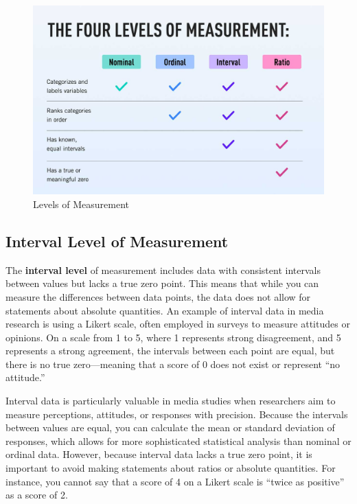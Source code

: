 \documentclass[
]{book}
\begin{document}
\begin{figure}
\centering
\includegraphics[width=1\linewidth,height=\textheight,keepaspectratio]{images/levels.jpg}
\caption{Levels of Measurement}
\end{figure}

\subsection*{Interval Level of Measurement}\label{interval-level-of-measurement}

The \textbf{interval level} of measurement includes data with consistent intervals between values but lacks a true zero point. This means that while you can measure the differences between data points, the data does not allow for statements about absolute quantities. An example of interval data in media research is using a Likert scale, often employed in surveys to measure attitudes or opinions. On a scale from 1 to 5, where 1 represents strong disagreement, and 5 represents a strong agreement, the intervals between each point are equal, but there is no true zero---meaning that a score of 0 does not exist or represent ``no attitude.''

Interval data is particularly valuable in media studies when researchers aim to measure perceptions, attitudes, or responses with precision. Because the intervals between values are equal, you can calculate the mean or standard deviation of responses, which allows for more sophisticated statistical analysis than nominal or ordinal data. However, because interval data lacks a true zero point, it is important to avoid making statements about ratios or absolute quantities. For instance, you cannot say that a score of 4 on a Likert scale is ``twice as positive'' as a score of 2.
\end{document}
